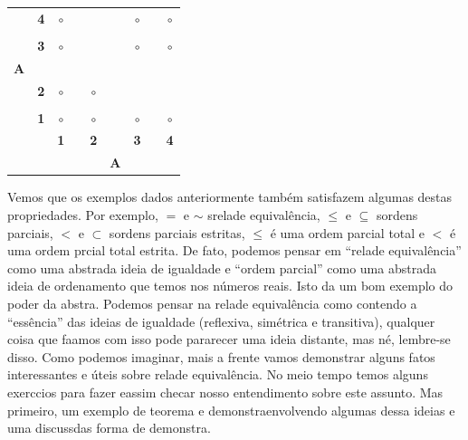 \begin{table}[h]
\centering
\begin{tabular}{ccccccccc}
\multicolumn{1}{c}{       } &  \multicolumn{1}{c|}{{\bf 4}} & $\circ$ & \qquad& \frame{$\circ$} &\quad & $\circ$ &\qquad & $\circ$ \\
\multicolumn{1}{c}{       } &  \multicolumn{1}{c|}{       } &         & \qquad&         &\quad &         &       &         \\
\multicolumn{1}{c}{       } &  \multicolumn{1}{c|}{{\bf 3}} & $\circ$ & \qquad& \frame{$\circ$} &\quad & $\circ$ &\qquad & $\circ$ \\
\multicolumn{1}{c}{{\bf A}} &  \multicolumn{1}{c|}{       } &         & \qquad&         &\quad &         &       &         \\
\multicolumn{1}{c}{       } &  \multicolumn{1}{c|}{{\bf 2}} & $\circ$ & \qquad& $\circ$ &\quad & \frame{$\circ$} &\qquad & \frame{$\circ$} \\
\multicolumn{1}{c}{       } &  \multicolumn{1}{c|}{       } &         & \qquad&         &\quad &         &       &         \\
\multicolumn{1}{c}{       } &  \multicolumn{1}{c|}{{\bf 1}} & $\circ$ & \qquad& $\circ$ &\quad & $\circ$ &\qquad & $\circ$ \\\cline{3-9}
                            &                               & {\bf 1} & \qquad& {\bf 2} &\quad & {\bf 3} &\qquad & {\bf 4} \\
                            &                               &         &      &         &{\bf A}&        &      &         \\
\end{tabular}
\end{table}

Vemos que os exemplos dados anteriormente tamb\'em satisfazem algumas destas propriedades. Por exemplo, $=$ e $\sim$ s\ao rela\coes de equival\^encia, $\leq$ e $\subseteq$ s\ao ordens parciais, $<$ e $\subset$ s\ao ordens parciais estritas, $\leq$ \'e uma ordem parcial total e $<$ \'e uma ordem prcial total estrita. De fato, podemos pensar em ``rela\cao de equival\^encia'' como uma abstra\cao da ideia de igualdade e ``ordem parcial'' como uma abstra\cao da ideia de ordenamento que temos nos n\'umeros reais. Isto da um bom exemplo do poder da abstra\caoi. Podemos pensar na rela\coes de equival\^encia como contendo a ``ess\^encia'' das ideias de igualdade (reflexiva, sim\'etrica e transitiva), qualquer coisa que fa\cc amos com isso pode pararecer uma ideia distante, mas n\ao \'e, lembre-se disso. Como podemos imaginar, mais a frente vamos demonstrar alguns fatos interessantes e \'uteis sobre rela\coes de equival\^encia. No meio tempo temos alguns exerc\ih cios para fazer eassim checar nosso entendimento sobre este assunto. Mas primeiro, um exemplo de teorema e demonstra\cao envolvendo algumas dessa ideias e uma discuss\ao das forma de demonstra\caoi.

